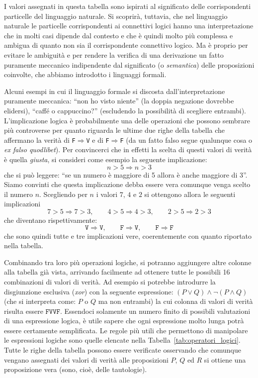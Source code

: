\documentclass[italian,a4paper,hidelinks,headinclude]{scrartcl}
\newcommand{\myemph}[1]{\emph{#1}\marginpar{#1}}
\begin{document}
I valori assegnati in questa tabella sono ispirati al significato
delle corrispondenti particelle del linguaggio naturale. Si scoprirà,
tuttavia, che nel linguaggio naturale le particelle corrispondenti ai
connettivi logici hanno una interpretazione che in molti casi dipende
dal contesto e che è quindi molto più complessa e ambigua di quanto
non sia il corrispondente connettivo logico. Ma è proprio per evitare
le ambiguità e per rendere la verifica di una derivazione un fatto
puramente meccanico indipendente dal significato (o \myemph{semantica})
delle proposizioni coinvolte, che abbiamo introdotto i linguaggi
formali.

Alcuni esempi in cui il linguaggio formale si discosta
dall'interpretazione puramente meccanica: ``non ho visto niente''
(la doppia negazione dovrebbe elidersi), ``caffé o cappuccino?''
(escludendo la possibilità di scegliere entrambi). L'implicazione
logica è probabilmente una delle operazioni che possono sembrare più
controverse per quanto riguarda le ultime due righe della tabella che
affermano la verità di \texttt{F}$\Rightarrow$\texttt{V} e di
\texttt{F}$\Rightarrow$\texttt{F} (da un fatto falso segue qualunque
cosa o \emph{ex falso quodlibet}). Per convincerci che in effetti la
scelta di questi valori di verità è quella \emph{giusta}, si consideri
come esempio
la seguente implicazione:
\[
n > 5 \Rightarrow n > 3
\]
che si può leggere: ``se un numero è maggiore di 5 allora è anche
maggiore di 3''. Siamo convinti che questa implicazione debba essere vera comunque
venga scelto il numero $n$. Scegliendo per $n$ i valori $7$, $4$ e $2$
si ottengono allora le seguenti implicazioni
\[
7 > 5 \Rightarrow 7>3, \qquad 4>5 \Rightarrow 4 > 3, \qquad 2>5
\Rightarrow 2>3
\]
che diventano rispettivamente:
\[
\texttt{V} \Rightarrow \texttt{V}, \qquad
\texttt{F} \Rightarrow \texttt{V}, \qquad
\texttt{F} \Rightarrow \texttt{F}
\]
che sono quindi tutte e tre implicazioni vere, coerentemente con
quanto riportato nella tabella.

Combinando tra loro più operazioni logiche, si potranno
aggiungere altre colonne alla tabella già vista, arrivando facilmente
ad ottenere tutte le possibili 16 combinazioni di valori di verità. Ad
esempio si potrebbe introdurre la disgiunzione esclusiva (\emph{xor})
con la seguente espressione: $(P \lor Q) \land \neg (P\land Q)$ (che
si interpreta come: $P$ o $Q$ ma non entrambi) la cui colonna di
valori di verità risulta essere $\texttt{FVVF}$. Essendoci solamente
un numero finito di possibili valutazioni di una espressione logica, è
utile sapere che ogni espressione molto lunga potrà essere certamente
semplificata. Le regole più utili che permettono di manipolare le
espressioni logiche sono quelle elencate nella Tabella~\ref{tab:operatori_logici}.
Tutte le righe della tabella possono essere verificate
osservando che comunque vengano assegnati dei valori di verità alle proposizioni
$P$, $Q$ ed $R$ si ottiene una proposizione vera (sono, cioè, delle tautologie).
\end{document}
